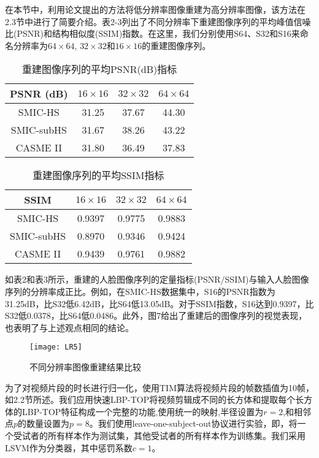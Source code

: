在本节中，利用论文提出的方法将低分辨率图像重建为高分辨率图像，该方法在2.3节中进行了简要介绍。表2-3列出了不同分辨率下重建图像序列的平均峰值信噪比(PSNR)和结构相似度(SSIM)指数。在这里，我们分别使用S64、S32和S16来命名分辨率为$ 64 \times 64 $, $ 32 \times 32 $和$ 16 \times 16 $的重建图像序列。

\begin{table}[!htbp]
\centering
\caption{重建图像序列的平均PSNR(dB)指标}
\label{tab5}
\begin{tabular}{c|ccc}
\hline
PSNR (dB) & $ 16 \times 16 $ & $ 32 \times 32 $ & $ 64 \times 64 $ \\ \hline
SMIC-HS & 31.25 & 37.67 & 44.30 \\
SMIC-subHS & 31.67 & 38.26 & 43.22 \\
CASME II & 31.80 & 36.49 & 37.83 \\ \hline
\end{tabular}
\end{table}

\begin{table}[!htbp]
\centering
\caption{重建图像序列的平均SSIM指标}
\label{tab6}
\begin{tabular}{c|ccc}
\hline
SSIM & $ 16 \times 16 $ & $ 32 \times 32 $ & $ 64 \times 64 $ \\ \hline
SMIC-HS & 0.9397 & 0.9775 & 0.9883 \\
SMIC-subHS & 0.8970 & 0.9346 & 0.9424 \\
CASME II & 0.9439 & 0.9761 & 0.9882 \\ \hline
\end{tabular}
\end{table}

如表2和表3所示，重建的人脸图像序列的定量指标(PSNR/SSIM)与输入人脸图像序列的分辨率成正比。例如，在SMIC-HS数据集中，S16的PSNR指数为31.25dB，比S32低6.42dB，比S64低13.05dB。对于SSIM指数，S16达到0.9397，比S32低0.0378，比S64低0.0486。此外，图7给出了重建后的图像序列的视觉表现，也表明了与上述观点相同的结论。

\begin{figure}[!htbp]
\centering
\texttt{[image: LR5]}
\caption{不同分辨率图像重建结果比较}
\label{fig15}
\end{figure}

为了对视频片段的时长进行归一化，使用TIM算法将视频片段的帧数插值为10帧，如2.2节所述。我们应用快速LBP-TOP将视频剪辑成不同的长方体和提取每个长方体的LBP-TOP特征构成一个完整的功能,使用统一的映射,半径设置为$ r=2 $,和相邻点$p$的数量设置为$ p=8 $。我们使用leave-one-subject-out协议进行实验，即，将一个受试者的所有样本作为测试集，其他受试者的所有样本作为训练集。我们采用LSVM作为分类器，其中惩罚系数$c=1$。

